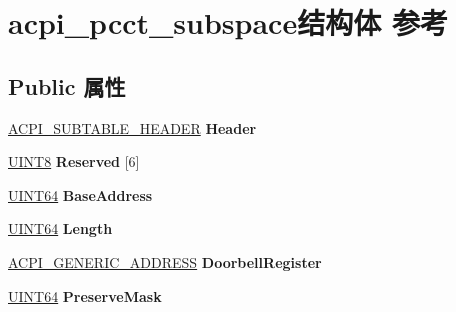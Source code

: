 \hypertarget{structacpi__pcct__subspace}{}\section{acpi\+\_\+pcct\+\_\+subspace结构体 参考}
\label{structacpi__pcct__subspace}
\subsection*{Public 属性}
\begin{DoxyCompactItemize}
\item 
\mbox{\label{structacpi__pcct__subspace_a07a21290f1cf3c8ccafc8399c0eeb446}} 
\hyperlink{structacpi__subtable__header}{A\+C\+P\+I\+\_\+\+S\+U\+B\+T\+A\+B\+L\+E\+\_\+\+H\+E\+A\+D\+ER} {\bfseries Header}
\item 
\mbox{\label{structacpi__pcct__subspace_a85a5b1f1ebfc7a3f3e2ffff201cc80f6}} 
\hyperlink{_processor_bind_8h_ab27e9918b538ce9d8ca692479b375b6a}{U\+I\+N\+T8} {\bfseries Reserved} \mbox{[}6\mbox{]}
\item 
\mbox{\label{structacpi__pcct__subspace_a9f39f5044908018e31ecc67efa93594f}} 
\hyperlink{_processor_bind_8h_a57be03562867144161c1bfee95ca8f7c}{U\+I\+N\+T64} {\bfseries Base\+Address}
\item 
\mbox{\label{structacpi__pcct__subspace_af8afaaa816290d8145e7690f8ad2815e}} 
\hyperlink{_processor_bind_8h_a57be03562867144161c1bfee95ca8f7c}{U\+I\+N\+T64} {\bfseries Length}
\item 
\mbox{\label{structacpi__pcct__subspace_acadd3e43d6ad96f50ea29c88210fc817}} 
\hyperlink{structacpi__generic__address}{A\+C\+P\+I\+\_\+\+G\+E\+N\+E\+R\+I\+C\+\_\+\+A\+D\+D\+R\+E\+SS} {\bfseries Doorbell\+Register}
\item 
\mbox{\label{structacpi__pcct__subspace_a553a959177643eb36ec7cc065f23b436}} 
\hyperlink{_processor_bind_8h_a57be03562867144161c1bfee95ca8f7c}{U\+I\+N\+T64} {\bfseries Preserve\+Mask}
\item 
\mbox{\label{structacpi__pcct__subspace_a2ede0d9af98efb0b9abfea1d3725f941}} 

\end{DoxyCompactItemize}
